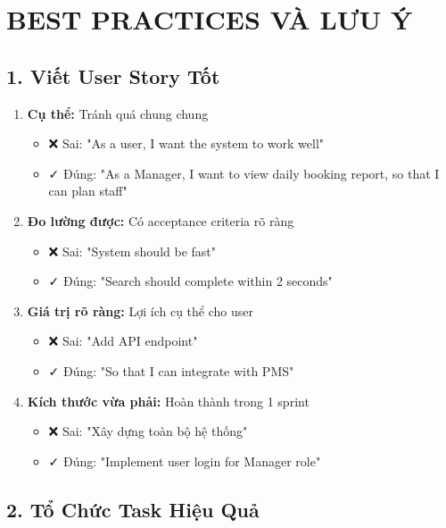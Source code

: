 \documentclass[12pt, a4paper]{report}
\begin{document}
\chapter{BEST PRACTICES VÀ LƯU Ý}

\section{1. Viết User Story Tốt}

\begin{enumerate}
    \item \textbf{Cụ thể:} Tránh quá chung chung
    \begin{itemize}
        \item ❌ Sai: "As a user, I want the system to work well"
        \item ✓ Đúng: "As a Manager, I want to view daily booking report, so that I can plan staff"
    \end{itemize}
    
    \item \textbf{Đo lường được:} Có acceptance criteria rõ ràng
    \begin{itemize}
        \item ❌ Sai: "System should be fast"
        \item ✓ Đúng: "Search should complete within 2 seconds"
    \end{itemize}
    
    \item \textbf{Giá trị rõ ràng:} Lợi ích cụ thể cho user
    \begin{itemize}
        \item ❌ Sai: "Add API endpoint"
        \item ✓ Đúng: "So that I can integrate with PMS"
    \end{itemize}
    
    \item \textbf{Kích thước vừa phải:} Hoàn thành trong 1 sprint
    \begin{itemize}
        \item ❌ Sai: "Xây dựng toàn bộ hệ thống"
        \item ✓ Đúng: "Implement user login for Manager role"
    \end{itemize}
\end{enumerate}

\section{2. Tổ Chức Task Hiệu Quả}
\end{document}
